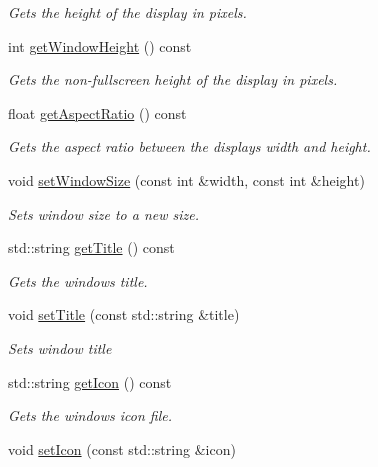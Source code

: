 \begin{DoxyCompactItemize}
\begin{DoxyCompactList}\small\item\em Gets the height of the display in pixels. \end{DoxyCompactList}\item 
int \hyperlink{classflounder_1_1display_ad9adfaf1f74d3b8198d60927ca196407}{get\+Window\+Height} () const
\begin{DoxyCompactList}\small\item\em Gets the non-\/fullscreen height of the display in pixels. \end{DoxyCompactList}\item 
float \hyperlink{classflounder_1_1display_a0c49110ba02af920bc83ac6c851ed931}{get\+Aspect\+Ratio} () const
\begin{DoxyCompactList}\small\item\em Gets the aspect ratio between the displays width and height. \end{DoxyCompactList}\item 
void \hyperlink{classflounder_1_1display_a13edcfe35505b3e164010ed1b232e5d1}{set\+Window\+Size} (const int \&width, const int \&height)
\begin{DoxyCompactList}\small\item\em Sets window size to a new size. \end{DoxyCompactList}\item 
std\+::string \hyperlink{classflounder_1_1display_ae472af54213c5e5d373ec4f97bbe67aa}{get\+Title} () const
\begin{DoxyCompactList}\small\item\em Gets the window\textquotesingle{}s title. \end{DoxyCompactList}\item 
void \hyperlink{classflounder_1_1display_a48680d3ed1b6842dea7eb5437d6c336f}{set\+Title} (const std\+::string \&title)
\begin{DoxyCompactList}\small\item\em Sets window title \end{DoxyCompactList}\item 
std\+::string \hyperlink{classflounder_1_1display_a086f8409c29970e414754b4c2f871bba}{get\+Icon} () const
\begin{DoxyCompactList}\small\item\em Gets the window\textquotesingle{}s icon file. \end{DoxyCompactList}\item 
void \hyperlink{classflounder_1_1display_a49ba8d850f666496fabf9133d01091ab}{set\+Icon} (const std\+::string \&icon)

\end{DoxyCompactItemize}
